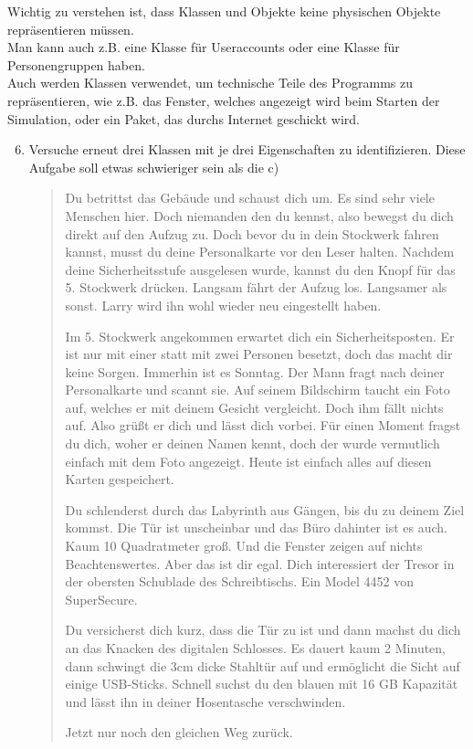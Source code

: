     \begin{Infobox}
        Wichtig zu verstehen ist, dass Klassen und Objekte keine physischen Objekte repräsentieren müssen.\\
        Man kann auch z.B. eine Klasse für Useraccounts oder eine Klasse für Personengruppen haben.\\
        Auch werden Klassen verwendet, um technische Teile des Programms zu repräsentieren, wie z.B. das Fenster, welches angezeigt wird beim Starten der Simulation, oder ein Paket, das durchs Internet geschickt wird.
    \end{Infobox}

\begin{enumerate} \setcounter{enumi}{5}
    \item \optional Versuche erneut drei Klassen mit je drei Eigenschaften  zu identifizieren. Diese Aufgabe soll etwas schwieriger sein als die c)
    \begin{quotation}
    Du betrittst das Gebäude und schaust dich um.
    Es sind sehr viele Menschen hier.
    Doch niemanden den du kennst, also bewegst du dich direkt auf den Aufzug zu.
    Doch bevor du in dein Stockwerk fahren kannst, musst du deine Personalkarte vor den Leser halten.
    Nachdem deine Sicherheitsstufe ausgelesen wurde, kannst du den Knopf für das 5. Stockwerk drücken.
    Langsam fährt der Aufzug los.
    Langsamer als sonst.
    Larry wird ihn wohl wieder neu eingestellt haben.

    Im 5. Stockwerk angekommen erwartet dich ein Sicherheitsposten.
    Er ist nur mit einer statt mit zwei Personen besetzt, doch das macht dir keine Sorgen.
    Immerhin ist es Sonntag.
    Der Mann fragt nach deiner Personalkarte und scannt sie.
    Auf seinem Bildschirm taucht ein Foto auf, welches er mit deinem Gesicht vergleicht.
    Doch ihm fällt nichts auf.
    Also grüßt er dich und lässt dich vorbei.
    Für einen Moment fragst du dich, woher er deinen Namen kennt, doch der wurde vermutlich einfach mit dem Foto angezeigt.
    Heute ist einfach alles auf diesen Karten gespeichert.

    Du schlenderst durch das Labyrinth aus Gängen, bis du zu deinem Ziel kommst.
    Die Tür ist unscheinbar und das Büro dahinter ist es auch.
    Kaum 10 Quadratmeter groß.
    Und die Fenster zeigen auf nichts Beachtenswertes.
    Aber das ist dir egal.
    Dich interessiert der Tresor in der obersten Schublade des Schreibtischs.
    Ein Model 4452 von SuperSecure.

    Du versicherst dich kurz, dass die Tür zu ist und dann machst du dich an das Knacken des digitalen Schlosses.
    Es dauert kaum 2 Minuten, dann schwingt die 3cm dicke Stahltür auf und ermöglicht die Sicht auf einige USB-Sticks.
    Schnell suchst du den blauen mit 16 GB Kapazität und lässt ihn in deiner Hosentasche verschwinden.

    Jetzt nur noch den gleichen Weg zurück.
    \end{quotation}
\end{enumerate}
